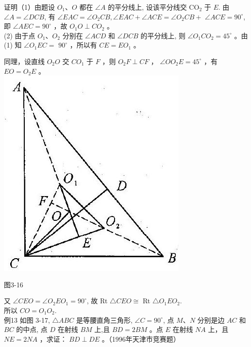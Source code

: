 \documentclass[10pt]{article}
\begin{document}
证明（1）由题设 $O_{1} 、 O$ 都在 $\angle A$ 的平分线上, 设该平分线交 $\mathrm{CO}_{2}$ 于 $E$. 由 $\angle A=\angle D C B$, 有 $\angle E A C=\angle O_{2} C B, \angle E A C+\angle A C E=\angle O_{2} C B+$ $\angle A C E=90^{\circ}$, 即 $\angle A E C=90^{\circ}$ ，故 $O_{1} O \perp C O_{2}$ 。\\
(2) 由于点 $O_{1} 、 O_{2}$ 分别在 $\angle A C D$ 和 $\angle D C B$ 的平分线上, 则 $\angle O_{1} C O_{2}=45^{\circ}$ 。由 (1) 知 $\angle O_{1} E C=$ $90^{\circ}$ ，所以有 $C E=E O_{1}$ 。

同理，设直线 $O_{2} O$ 交 $C O_{1}$ 于 $F$ ，则 $O_{2} F \perp C F$ ， $\angle O O_{2} E=45^{\circ}$ ，有 $E O=O_{2} E$ 。\\
\includegraphics[max width=\textwidth, center]{2024_10_30_2c8f45efd4a519b08e1ag-034(2)}

图3-16

又 $\angle C E O=\angle O_{2} E O_{1}=90^{\circ}$, 故 Rt $\triangle C E O \cong$ Rt $\triangle O_{1} E O_{2}$.\\
所以 $C O=O_{1} O_{2}$.\\
例13 如图 3-17, $\triangle A B C$ 是等腰直角三角形, $\angle C=90^{\circ}$, 点 $M 、 N$ 分别是边 $A C$ 和 $B C$ 的中点, 点 $D$ 在射线 $B M$ 上,且 $B D=2 B M$ 。点 $E$ 在射线 $N A$ 上，且 $N E=2 N A$ ，求证： $B D \perp D E$ 。（1996年天津市竞赛题）
\end{document}

